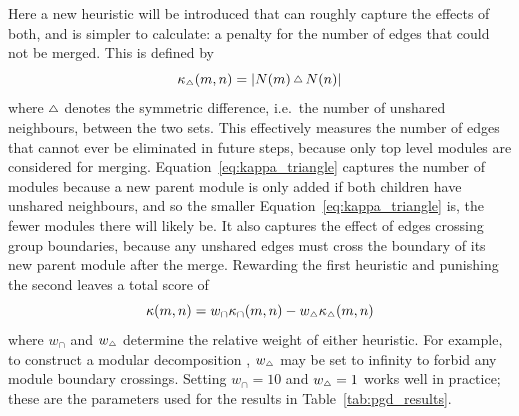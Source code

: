 Here a new heuristic will be introduced that can roughly capture the effects of both, and is simpler to calculate: a penalty for the number of edges that could not be merged. This is defined by
\begin{equation}
  \kappa_{\Triangle}(m, n) = |N(m)\,\Triangle\,N(n)|
  \label{eq:kappa_triangle}
\end{equation}
where $\Triangle$ denotes the symmetric difference, i.e.\ the number of unshared neighbours, between the two sets. This effectively measures the number of edges that cannot ever be eliminated in future steps, because only top level modules are considered for merging.
Equation~\eqref{eq:kappa_triangle} captures the number of modules because a new parent module is only added if both children have unshared neighbours, and so the smaller Equation~\eqref{eq:kappa_triangle} is, the fewer modules there will likely be. It also captures the effect of edges crossing group boundaries, because any unshared edges must cross the boundary of its new parent module after the merge.
Rewarding the first heuristic and punishing the second leaves a total score of
\begin{equation}
  \kappa(m,n) =
  w_\cap \kappa_\cap(m,n) -
  w_{\Triangle} \kappa_{\Triangle}(m,n)
  \label{eq:kappa_full}
\end{equation}
where $w_\cap$ and $w_{\Triangle}$ determine the relative weight of either heuristic. For example, to construct a modular decomposition \citep{Habib2004}, $w_{\Triangle}$ may be set to infinity to forbid any module boundary crossings.
Setting $w_\cap=10$ and $w_{\Triangle}=1$ works well in practice; these are the parameters used for the results in Table~\ref{tab:pgd_results}.

